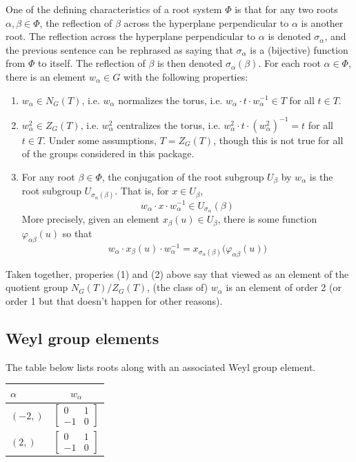 \documentclass[11pt]{article}
\newcommand{\noi}{\noindent}
\newcommand{\inv}{^{-1}}
\newcommand{\sig}{\sigma}
\theoremstyle{definition}
\begin{document}
One of the defining characteristics of a root system $\Phi$ is that for any two roots $\alpha, \beta \in \Phi$, the reflection of $\beta$ across the hyperplane perpendicular to $\alpha$ is another root. The reflection across the hyperplane perpendicular to $\alpha$ is denoted $\sig_\alpha$, and the previous sentence can be rephrased as saying that $\sig_\alpha$ is a (bijective) function from $\Phi$ to itself. The reflection of $\beta$ is then denoted $\sig_\alpha(\beta)$. For each root $\alpha \in \Phi$, there is an element $w_\alpha \in G$ with the following properties:
\begin{enumerate}
	\item $w_\alpha \in N_G(T)$, i.e. $w_\alpha$ normalizes the torus, i.e. $w_\alpha \cdot t \cdot w_\alpha \inv \in T$ for all $t \in T$.
	\item $w_\alpha^2 \in Z_G(T)$, i.e. $w_\alpha^2$ centralizes the torus, i.e. $w_\alpha^2 \cdot t \cdot (w_\alpha^2) \inv = t$ for all $t \in T$. Under some assumptions, $T = Z_G(T)$, though this is not true for all of the groups considered in this package.
	\item For any root $\beta \in \Phi$, the conjugation of the root subgroup $U_\beta$ by $w_\alpha$ is the root subgroup $U_{\sig_\alpha(\beta)}$. That is, for $x \in U_\beta$,
	\[
		w_\alpha \cdot x \cdot w_\alpha \inv \in U_{\sig_{\alpha}}(\beta)
	\]
	More precisely, given an element $x_\beta(u) \in U_\beta$, there is some function $\varphi_{\alpha \beta}(u)$ so that
	\[
		w_\alpha \cdot x_\beta(u) \cdot w_\alpha \inv = x_{\sig_{\alpha}(\beta)} \Big( \varphi_{\alpha \beta}(u) \Big)
	\]
\end{enumerate}
Taken together, properies (1) and (2) above say that viewed as an element of the quotient group $N_G(T)/Z_G(T)$, (the class of) $w_\alpha$ is an element of order 2 (or order 1 but that doesn't happen for other reasons).

\subsection{Weyl group elements}

\noi The table below lists roots along with an associated Weyl group element.

\bigskip

\noi \noindent \begin{longtable}{|l|c|}
    \hline
    $\alpha$ & $w_\alpha$ \\
    \hline
    \endhead
    $\left( -2,\right)$ & ${\left[\begin{matrix}0 & 1\\-1 & 0\end{matrix}\right]}$ \\
    \hline
    $\left( 2,\right)$ & ${\left[\begin{matrix}0 & 1\\-1 & 0\end{matrix}\right]}$ \\
    \hline
\end{longtable}
\end{document}
